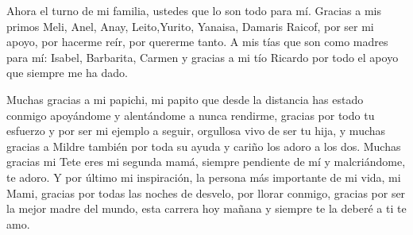 \begin{acknowledgements}
    Ahora el turno de mi familia, ustedes que lo son todo para mí.
    Gracias a mis primos Meli, Anel, Anay, Leito,Yurito, Yanaisa, Damaris Raicof, por ser mi apoyo, por hacerme reír, por quererme tanto.
    A mis tías que son como madres para mí: Isabel, Barbarita, Carmen y gracias a mi tío Ricardo por todo el apoyo que siempre me ha dado.
    
    Muchas gracias a mi papichi, mi papito que desde la distancia has estado conmigo apoyándome y alentándome a nunca rendirme, gracias por todo tu 
    esfuerzo y por ser mi ejemplo a seguir, orgullosa vivo de ser tu hija, y muchas gracias a Mildre también por toda su ayuda y cariño los adoro a los dos.
    Muchas gracias mi Tete eres mi segunda mamá, siempre pendiente de mí y malcriándome, te adoro.
    Y por último mi inspiración, la persona más importante de mi vida, mi Mami, gracias por todas las noches de desvelo, por llorar conmigo, gracias por ser la mejor madre del mundo, esta carrera hoy mañana y siempre te la deberé a ti te amo.
\end{acknowledgements}